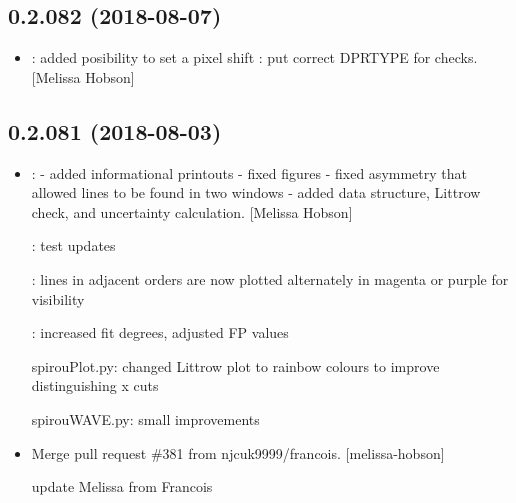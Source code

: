 \documentclass[a4paper,10pt,english]{report}
\begin{document}
\subsection{0.2.082 (2018-08-07)}
\label{\detokenize{misc/changelog:id381}}\begin{itemize}
\item {} 
: added posibility to set a pixel shift
: put correct DPRTYPE for  checks. {[}Melissa
Hobson{]}

\end{itemize}


\subsection{0.2.081 (2018-08-03)}
\label{\detokenize{misc/changelog:id382}}\begin{itemize}
\item {} 
: - added informational printouts - fixed
figures - fixed asymmetry that allowed lines to be found in two
windows - added  data structure, Littrow check, and
uncertainty calculation. {[}Melissa Hobson{]}

: test updates

: lines in adjacent orders are now plotted alternately in magenta or purple for visibility

: increased fit degrees, adjusted FP values

spirouPlot.py: changed Littrow plot to rainbow colours to improve distinguishing x cuts

spirouWAVE.py: small improvements

\item {} 
Merge pull request \#381 from njcuk9999/francois. {[}melissa-hobson{]}

update Melissa from Francois

\end{itemize}
\end{document}
